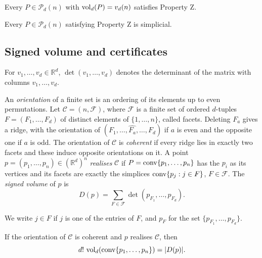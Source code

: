 \begin{remark}
  \label{rem:propertyz}
  Every $P \in \mathcal{P}_{d}(n)$ with $\operatorname{vol}_{d}(P) = v_{d}(n)$ satisfies
  Property Z.
\end{remark}

\begin{lemma}
  \label{lem:simplicial}
  Every $P \in \mathcal{P}_{d}(n)$ satisfying Property Z is simplicial.
\end{lemma}

\subsection{Signed volume and certificates}

For $v_{1}, \ldots, v_{d} \in \mathbb{R}^{d}$, $\det(v_{1}, \ldots, v_{d})$
denotes the determinant of the matrix with columns $v_{1}, \ldots, v_{d}$.

\begin{definition}
  \label{def:signed-volume}
  An \emph{orientation} of a finite set is an ordering of its elements up to
  even permutations. Let $\mathcal{C} = (n, \mathcal{F})$, where
  $\mathcal{F}$ is a finite set of ordered $d$-tuples
  $F = (F_{1}, \ldots, F_{d})$ of distinct elements of $\{1, \ldots, n\}$,
  called facets. Deleting $F_{a}$ gives a ridge, with the orientation of
  $(F_{1}, \ldots, \widehat{F_{a}}, \ldots, F_{d})$ if $a$ is even and the
  opposite one if $a$ is odd. The orientation of $\mathcal{C}$ is
  \emph{coherent} if every ridge lies in exactly two facets and these induce
  opposite orientations on it. A point
  $p = (p_{1}, \ldots, p_{n}) \in (\mathbb{R}^{d})^{n}$ \emph{realises}
  $\mathcal{C}$ if $P = \operatorname{conv}\{p_{1}, \ldots, p_{n}\}$ has the $p_{i}$ as its
  vertices and its facets are exactly the simplices
  $\operatorname{conv}\{p_{j} : j \in F\}$, $F \in \mathcal{F}$. The \emph{signed volume}
  of $p$ is
  \begin{equation}
    \label{eq:signed-volume}
    D(p) = \sum_{F \in \mathcal{F}} \det(p_{F_{1}}, \ldots, p_{F_{d}}).
  \end{equation}
\end{definition}

We write $j \in F$ if $j$ is one of the entries of $F$, and $p_{F}$ for the
set $\{p_{F_{1}}, \ldots, p_{F_{d}}\}$.

\begin{lemma}
  \label{lem:volume}
  If the orientation of $\mathcal{C}$ is coherent and $p$ realises
  $\mathcal{C}$, then
  \[
    d!\,\operatorname{vol}_{d}(\operatorname{conv}\{p_{1}, \ldots, p_{n}\}) = |D(p)|.
  \]
\end{lemma}

